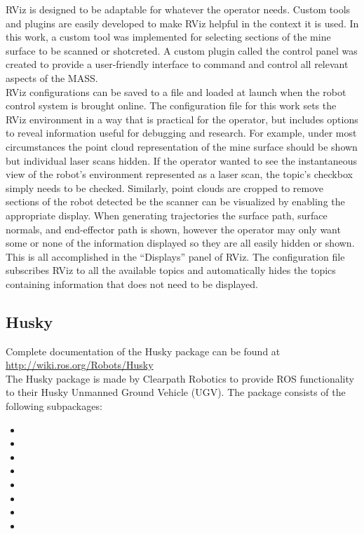 RViz is designed to be adaptable for whatever the operator needs. Custom tools and plugins are easily developed to make RViz helpful in the context it is used. In this work, a custom tool was implemented for selecting sections of the mine surface to be scanned or shotcreted. A custom plugin called the control panel was created to provide a user-friendly interface to command and control all relevant aspects of the MASS.\\

RViz configurations can be saved to a file and loaded at launch when the robot control system is brought online. The configuration file for this work sets the RViz environment in a way that is practical for the operator, but includes options to reveal information useful for debugging and research. For example, under most circumstances the point cloud representation of the mine surface should be shown but individual laser scans hidden. If the operator wanted to see the instantaneous view of the robot's environment represented as a laser scan, the topic's checkbox simply needs to be checked. Similarly, point clouds are cropped to remove sections of the robot detected be the scanner can be visualized by enabling the appropriate display. When generating trajectories the surface path, surface normals, and end-effector path is shown, however the operator may only want some or none of the information displayed so they are all easily hidden or shown. This is all accomplished in the ``Displays'' panel of RViz. The configuration file subscribes RViz to all the available topics and automatically hides the topics containing information that does not need to be displayed.\\

\subsection{Husky}

Complete documentation of the Husky package can be found at \url{http://wiki.ros.org/Robots/Husky}\\

The Husky package is made by Clearpath Robotics to provide ROS functionality to their Husky Unmanned Ground Vehicle (UGV). The package consists of the following subpackages:

\begin{itemize}
    \item {}
    \item {}
    \item {}
    \item {}
    \item {}
    \item {}
    \item {}
    \item {}
\end{itemize}

